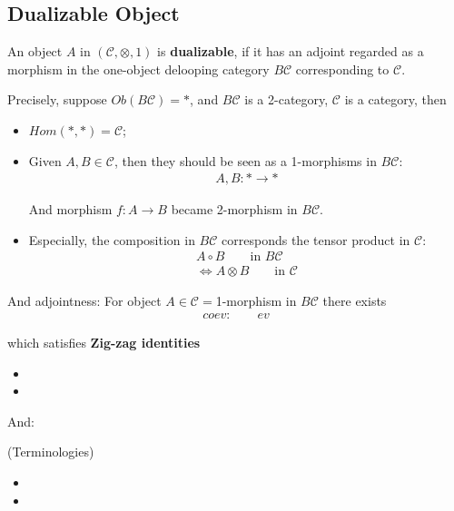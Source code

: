 \documentclass[Total.tex]{subfiles}
\begin{document}
			\subsection{Dualizable Object}
				\begin{Def}
					An object $A$ in $(\mathcal{C},\otimes,1)$ is \textbf{dualizable}, if it has an adjoint regarded as a morphism in the one-object delooping category $B\mathcal{C}$ corresponding to $\mathcal{C}$.
					
					Precisely, suppose $Ob(B\mathcal{C})=*$, and $B\mathcal{C}$ is a 2-category, $\mathcal{C}$ is a category, then
					\begin{itemize}
						\item $Hom(*,*)=\mathcal{C}$;
						\item Given $A,B\in \mathcal{C}$, then they should be seen as a 1-morphisms in $B\mathcal{C}$:
						\begin{gather*}
							A,B:*\rightarrow *
						\end{gather*}
						
						And morphism $f:A\rightarrow B$ became 2-morphism in $B\mathcal{C}$.
						\item Especially, the composition in $B\mathcal{C}$ corresponds the tensor product in $\mathcal{C}$:
						\begin{gather*}
							A\circ B\qquad \mbox{in }B\mathcal{C}\\
							\Leftrightarrow A\otimes B \qquad\mbox{in }\mathcal{C	}
						\end{gather*}
					\end{itemize}
					
					And adjointness: For object $A\in \mathcal{C}=$1-morphism in $B\mathcal{C}$ there exists 
					\begin{gather*}
						coev:\qquad ev
					\end{gather*}
					
					which satisfies \textbf{Zig-zag identities}
					\begin{itemize}
						\item 
						\item 
					\end{itemize}
				\end{Def}
				
				And:
				\begin{Def}
					(Terminologies) 
					\begin{itemize}
						\item 
						\item 
					\end{itemize}
				\end{Def}
\end{document}
